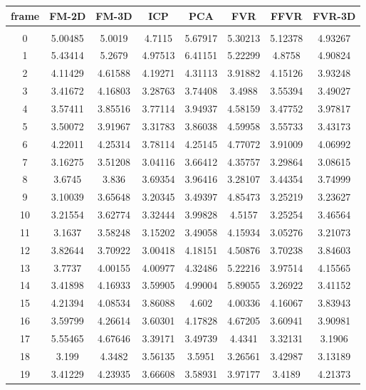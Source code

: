\begin{center}
\begin{longtable}{cccccccc}
\hline
\textbf{frame} & \textbf{FM-2D} & \textbf{FM-3D} & \textbf{ICP} & \textbf{PCA} & \textbf{FVR} & \textbf{FFVR} & \textbf{FVR-3D} \\
\hline \\
0 & 5.00485 & 5.0019 & 4.7115 & 5.67917 & 5.30213 & 5.12378 & 4.93267\\
1 & 5.43414 & 5.2679 & 4.97513 & 6.41151 & 5.22299 & 4.8758 & 4.90824\\
2 & 4.11429 & 4.61588 & 4.19271 & 4.31113 & 3.91882 & 4.15126 & 3.93248\\
3 & 3.41672 & 4.16803 & 3.28763 & 3.74408 & 3.4988 & 3.55394 & 3.49027\\
4 & 3.57411 & 3.85516 & 3.77114 & 3.94937 & 4.58159 & 3.47752 & 3.97817\\
5 & 3.50072 & 3.91967 & 3.31783 & 3.86038 & 4.59958 & 3.55733 & 3.43173\\
6 & 4.22011 & 4.25314 & 3.78114 & 4.25145 & 4.77072 & 3.91009 & 4.06992\\
7 & 3.16275 & 3.51208 & 3.04116 & 3.66412 & 4.35757 & 3.29864 & 3.08615\\
8 & 3.6745 & 3.836 & 3.69354 & 3.96416 & 3.28107 & 3.44354 & 3.74999\\
9 & 3.10039 & 3.65648 & 3.20345 & 3.49397 & 4.85473 & 3.25219 & 3.23627\\
10 & 3.21554 & 3.62774 & 3.32444 & 3.99828 & 4.5157 & 3.25254 & 3.46564\\
11 & 3.1637 & 3.58248 & 3.15202 & 3.49058 & 4.15934 & 3.05276 & 3.21073\\
12 & 3.82644 & 3.70922 & 3.00418 & 4.18151 & 4.50876 & 3.70238 & 3.84603\\
13 & 3.7737 & 4.00155 & 4.00977 & 4.32486 & 5.22216 & 3.97514 & 4.15565\\
14 & 3.41898 & 4.16933 & 3.59905 & 4.99004 & 5.89055 & 3.26922 & 3.41152\\
15 & 4.21394 & 4.08534 & 3.86088 & 4.602 & 4.00336 & 4.16067 & 3.83943\\
16 & 3.59799 & 4.26614 & 3.60301 & 4.17828 & 4.67205 & 3.60941 & 3.90981\\
17 & 5.55465 & 4.67646 & 3.39171 & 3.49739 & 4.4341 & 3.32131 & 3.1906\\
18 & 3.199 & 4.3482 & 3.56135 & 3.5951 & 3.26561 & 3.42987 & 3.13189\\
19 & 3.41229 & 4.23935 & 3.66608 & 3.58931 & 3.97177 & 3.4189 & 4.21373\\

\end{longtable}
\end{center}
